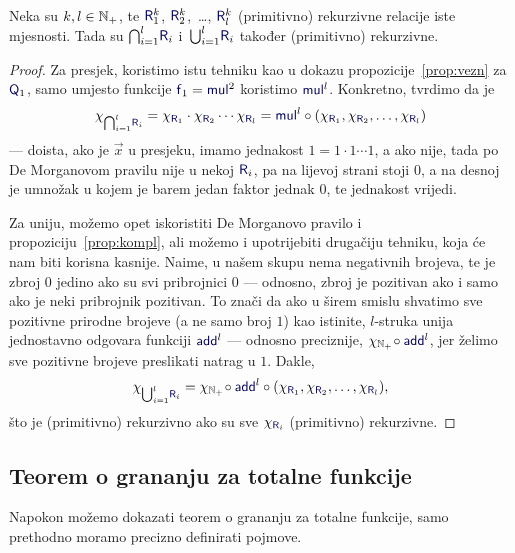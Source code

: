 \begin{propozicija}[{name=[višestruke unije i presjeci čuvaju (primitivnu) rekurzivnost]}]\label{prop:skupl}
Neka su $k,l\in{\mathbb N}_+$, te $\f R_1^k$, $\f R_2^k$,~\ldots, $\f R_l^k$ (primitivno) rekurzivne relacije iste mjesnosti. Tada su $\bigcap_{i=1}^l\!\f R_i$ i\, $\bigcup_{i=1}^l\!\f R_i$ također (primitivno) rekurzivne.
\end{propozicija}
\begin{proof}
Za presjek, koristimo istu tehniku kao u dokazu propozicije~\ref{prop:vezn} za $\f Q_1$, samo umjesto funkcije $\f f_1=\f{mul}^2$ koristimo $\f{mul}^l$. Konkretno, tvrdimo da je \begin{equation}
    \chi_{\bigcap_{i=1}^l\!\f R_i}=\chi_{\f R_1}\cdot\chi_{\f R_2}\dotsm\chi_{\f R_l}=\f{mul}^l\circ(\chi_{\f R_1},\chi_{\f R_2},\dotsc,\chi_{\f R_l})
\end{equation}
--- doista, ako je $\vec x$ u presjeku, imamo jednakost $1=1\cdot1\dotsm1$, a ako nije, tada po De Morganovom pravilu nije u nekoj $\f{R}_i$, pa na lijevoj strani stoji $0$, a na desnoj je umnožak u kojem je barem jedan faktor jednak $0$, te jednakost vrijedi.

Za uniju, možemo opet iskoristiti De Morganovo pravilo i propoziciju~\ref{prop:kompl}, ali možemo i upotrijebiti drugačiju tehniku, koja će nam biti korisna kasnije. Naime, u našem skupu nema negativnih brojeva, te je zbroj $0$ jedino ako su svi pribrojnici $0$ --- odnosno, zbroj je pozitivan ako i samo ako je neki pribrojnik pozitivan. To znači da ako u širem smislu shvatimo sve pozitivne prirodne brojeve (a ne samo broj $1$) kao istinite, $l$-struka unija jednostavno odgovara funkciji $\f{add}^l$ --- odnosno preciznije, $\chi_{\N_+}\!\circ\f{add}^l$, jer želimo sve pozitivne brojeve preslikati natrag u $1$. Dakle,
\begin{equation}
\label{eq:unk}
    \chi_{\bigcup_{i=1}^l\!\f R_i}=\chi_{\N_+}\!\circ\f{add}^l\circ(\chi_{\f R_1},\chi_{\f R_2},\dotsc,\chi_{\f R_l})\text,
\end{equation}
što je (primitivno) rekurzivno ako su sve $\chi_{\f R_i}$ (primitivno) rekurzivne.
\end{proof}

\subsection{Teorem o grananju za totalne funkcije}

Napokon možemo dokazati teorem o grananju za totalne funkcije, samo prethodno moramo precizno definirati pojmove.

